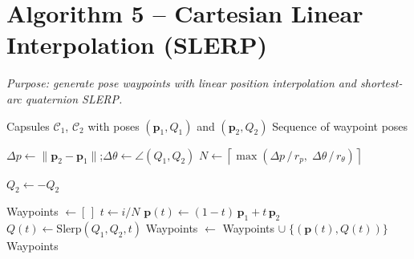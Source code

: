 \documentclass[11pt]{article}
\newcommand{\AlgTarget}[1]{\hypertarget{#1}{}}
\begin{document}
\section*{Algorithm 5 -- Cartesian Linear Interpolation (SLERP)}
\noindent\textit{Purpose: generate pose waypoints with linear position interpolation and shortest-arc quaternion SLERP.}
\AlgTarget{alg:cart_linear_interp}
\begin{algorithm}[H]
\caption{\textsc{CartLinearInterp}($\mathcal{C}_1,\, \mathcal{C}_2$)}
\begin{algorithmic}[1]
\Require Capsules $\mathcal{C}_1$, $\mathcal{C}_2$ with poses $(\mathbf{p}_1, Q_1)$ and $(\mathbf{p}_2, Q_2)$
\Ensure  Sequence of waypoint poses

\State $\Delta p \gets \|\mathbf{p}_2 - \mathbf{p}_1\|$;\quad $\Delta\theta \gets \angle(Q_1, Q_2)$
\State $N \gets \left\lceil \max\!\left(\Delta p\,/\,r_p,\;\Delta\theta\,/\,r_\theta\right) \right\rceil$
\quad{}

 $Q_2 \gets -Q_2$ \EndIf
\quad{}

\State Waypoints $\gets [\,]$
  \State $t \gets i/N$
  \State $\mathbf{p}(t) \gets (1-t)\,\mathbf{p}_1 + t\,\mathbf{p}_2$
  \State $Q(t) \gets \text{Slerp}(Q_1, Q_2, t)$
  \State Waypoints $\gets$ Waypoints $\cup\; \{(\mathbf{p}(t), Q(t))\}$
\EndFor
\State \Return Waypoints
\end{algorithmic}
\end{algorithm}

\end{document}
